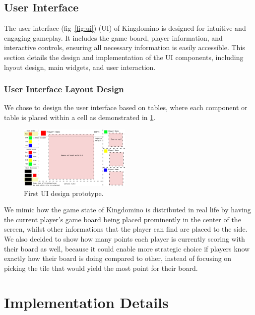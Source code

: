 \documentclass[conference]{IEEEtran}
\begin{document}
\subsection{User Interface}

The user interface (fig~\ref{fig:ui}) (UI) of Kingdomino is designed for intuitive and engaging gameplay. It includes the game board, player information, and interactive controls, ensuring all necessary information is easily accessible. This section details the design and implementation of the UI components, including layout design, main widgets, and user interaction.

\subsubsection{User Interface Layout Design}

We chose to design the user interface based on tables, where each component or
table is placed within a cell as demonstrated in \ref{fig:ui-proto}.

\begin{figure}[htbp]
    \centerline{\includegraphics[width=0.48\textwidth]{assets/ui-prototype.png}}
    \caption{First UI design prototype.}\label{fig:ui-proto}
\end{figure}

We mimic how the game state of Kingdomino is distributed in real life by having
the current player's game board being placed prominently in the center of the
screen, whilst other informations that the player can find are placed to the
side. We also decided to show how many points each player is currently scoring
with their board as well, because it could enable more strategic choice if
players know exactly how their board is doing compared to other, instead of
focusing on picking the tile that would yield the most point for their board.

\section{Implementation Details}
\label{sec:implementation_details}
\end{document}
